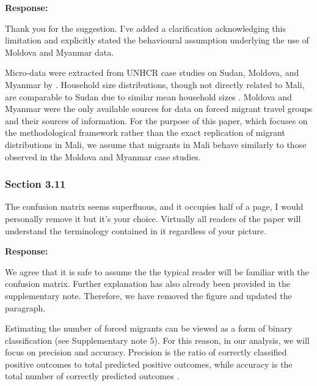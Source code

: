 \documentclass[11pt,a4paper]{article}
\begin{document}
\textbf{Response:}

Thank you for the suggestion. I've added a clarification acknowledging this limitation and explicitly stated the behavioural assumption underlying the use of Moldova and Myanmar data.

\vspace{0.5cm}

\begin{updatebox}

    Micro-data were extracted from UNHCR case studies on Sudan, Moldova, and Myanmar by \citet{He-In}. Household size 
distributions, though not directly related to Mali, are comparable to Sudan due to similar mean household sizes 
\citep{dhs_sr261,ESRI_AverageHousehold}. Moldova and Myanmar were the only available sources for data on forced migrant 
travel groups and their sources of information. For the purpose of this paper, which focuses on the methodological 
framework rather than the exact replication of migrant distributions in Mali, we assume that migrants in Mali behave 
similarly to those observed in the Moldova and Myanmar case studies.

\end{updatebox}

\vspace{0.5cm}

\subsubsection*{Section 3.11}

\begin{reviewbox}
The confusion matrix seems superfluous, and it occupies half of a page, I would personally remove it but it's your choice. Virtually all readers of the paper will understand the terminology contained in it regardless of your picture.
\end{reviewbox}

\textbf{Response:}

We agree that it is safe to assume the the typical reader will be familiar with the confusion matrix.
Further explanation has also already been provided in the supplementary note. Therefore, we have removed
the figure and updated the paragraph.

\vspace{0.5cm}

\begin{updatebox}
Estimating the number of forced migrants can be viewed as a form of binary classification (see Supplementary note 5). 
For this reason, in our analysis, we will focus on precision and accuracy. 
Precision is the ratio of correctly classified positive outcomes to total 
predicted positive outcomes, while accuracy is the total number of correctly predicted outcomes \citep{confusion}.
\end{updatebox}
\end{document}
